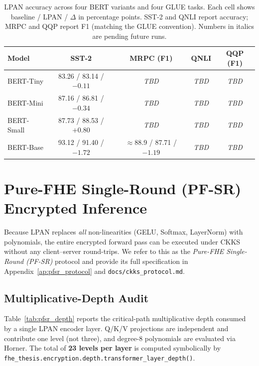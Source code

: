 \begin{table}[htbp]
\centering
\caption{LPAN accuracy across four BERT variants and four GLUE tasks. Each cell shows baseline / LPAN / $\Delta$ in percentage points. SST-2 and QNLI report accuracy; MRPC and QQP report F1 (matching the GLUE convention). Numbers in italics are pending future runs.}
\label{tab:lpan_glue}
\begin{tabular}{lcccc}
\toprule
\textbf{Model} & \textbf{SST-2} & \textbf{MRPC (F1)} & \textbf{QNLI} & \textbf{QQP (F1)} \\
\midrule
BERT-Tiny  & 83.26 / 83.14 / $-0.11$ & \textit{TBD} & \textit{TBD} & \textit{TBD} \\
BERT-Mini  & 87.16 / 86.81 / $-0.34$ & \textit{TBD} & \textit{TBD} & \textit{TBD} \\
BERT-Small & 87.73 / 88.53 / $+0.80$ & \textit{TBD} & \textit{TBD} & \textit{TBD} \\
BERT-Base  & 93.12 / 91.40 / $-1.72$ & $\approx$88.9 / 87.71 / $-1.19$ & \textit{TBD} & \textit{TBD} \\
\bottomrule
\end{tabular}
\end{table}

\section{Pure-FHE Single-Round (PF-SR) Encrypted Inference}
\label{sec:pfsr_results}

Because LPAN replaces \emph{all} non-linearities (GELU, Softmax, LayerNorm) with polynomials, the entire encrypted forward pass can be executed under CKKS without any client--server round-trips. We refer to this as the \emph{Pure-FHE Single-Round (PF-SR)} protocol and provide its full specification in Appendix~\ref{ap:pfsr_protocol} and \texttt{docs/ckks\_protocol.md}.

\subsection{Multiplicative-Depth Audit}
Table~\ref{tab:pfsr_depth} reports the critical-path multiplicative depth consumed by a single LPAN encoder layer. Q/K/V projections are independent and contribute one level (not three), and degree-8 polynomials are evaluated via Horner. The total of \textbf{23 levels per layer} is computed symbolically by \texttt{fhe\_thesis.encryption.depth.transformer\_layer\_depth()}.

